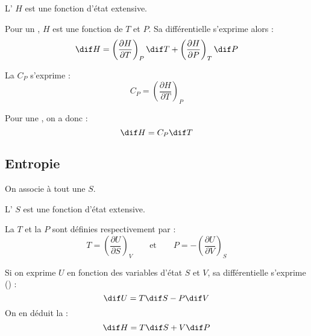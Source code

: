 \begin{propriete}
L' $H$ est une fonction d'état extensive.
\end{propriete}

\begin{propriete}
Pour un , $H$ est une fonction de $T$ et $P$. Sa différentielle s'exprime alors :
\[\dif H = \left(\frac{\partial H}{\partial T}\right)_P \dif T + \left(\frac{\partial H}{\partial P}\right)_T \dif P\]
\end{propriete}

\begin{definition}
La  $C_P$ s'exprime :
\[C_P = \left(\frac{\partial H}{\partial T}\right)_P\]
\end{definition}

\begin{remarque}
Pour une , on a donc :
\[\dif H = C_P \dif T\]
\end{remarque}



\subsection{Entropie}

\begin{definition}
On associe à tout  une  $S$.
\end{definition}

\begin{propriete}
L' $S$ est une fonction d'état extensive.
\end{propriete}

\begin{definition}
La  $T$ et la  $P$ sont définies respectivement par :
\[T = \left(\frac{\partial U}{\partial S}\right)_V \qquad \text{et} \qquad P = -\left(\frac{\partial U}{\partial V}\right)_S\]
\end{definition}

\begin{propriete}
Si on exprime $U$ en fonction des variables d'état $S$ et $V$, sa différentielle s'exprime () :
\[\dif U = T \dif S - P \dif V\]
On en déduit la  :
\[\dif H = T \dif S + V \dif P\]
\end{propriete}




